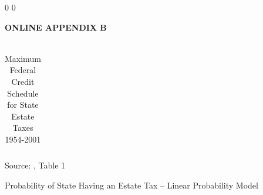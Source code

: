 \documentclass[12pt]{article}
\begin{document}

\clearpage



\setcounter {table} {0}
\setcounter {figure} {0}
\renewcommand{\thetable}{B\arabic{table}}
\renewcommand{\thefigure}{B\arabic{figure}}




\begin{table}
\begin{center}
\textbf{ONLINE APPENDIX B}

	\caption{\\Maximum Federal Credit Schedule for State Estate Taxes\\1954-2001}
		\scalebox{1} {
		\renewenvironment{table}[1][]{\ignorespaces}{\unskip}
        \begin{tabular}{ccc}
		
        \label{tab:fedcreditrates}
        \end{tabular}
	}
\end{center}
\vspace{-6pt}
\footnotesize{\qquad \qquad \qquad \quad Source: \cite{bakija/slemrod:2004}, Table 1}
\vspace{10cm}
\end{table}


\begin{table}
	\centering
	\caption{Probability of State Having an Estate Tax -- Linear Probability Model}
	\scalebox{0.8}{
		\renewenvironment{table}[1][]{\ignorespaces}{\unskip}
		
		\unskip
	}
\label{tab:ETadopt}
\end{table}
\clearpage
\end{document}
